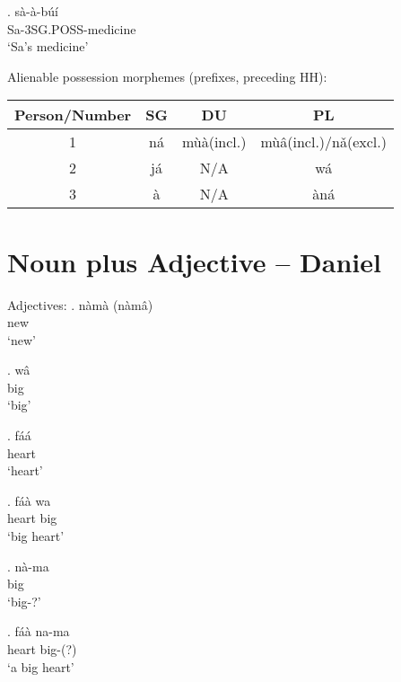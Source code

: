 \documentclass{assets/fieldnotes}
\newcommand{\mb}[1]{\textcolor{Dandelion}{#1}}
\begin{document}
\exg. sà-à-búí\\
    Sa-3SG.POSS-medicine\\
    `Sa's medicine'


Alienable possession morphemes (prefixes, preceding HH):
\begin{center}
    \begin{tabular}{|c|c|c|c|}
    \hline
    Person/Number & SG & DU & PL \\ \hline
    1 & ná & m\mb{ùà}(incl.) & m\mb{ùâ}(incl.)/nǎ(excl.) \\ \hline
    2 & já & N/A & wá \\ \hline
    3 & à & N/A & àná \\ \hline
    \end{tabular}
\end{center}




\section{Noun plus Adjective -- Daniel} %



Adjectives:
\exg. nàmà (nàmâ)\\
new\\
`new'

\exg. wâ\\
big\\
`big'

\exg. fáá\\
heart\\
`heart'

\exg. fáà wa\\
heart big\\
`big heart'

\exg. nà-ma\\
big\\
`big-?'

\exg. fáà na-ma\\
heart big-(?)\\
`a big heart'
\end{document}
